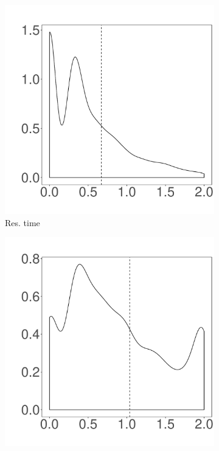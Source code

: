 \begin{figure}[t]
	\centering
        \begin{subfigure}{0.19\textwidth}
                \includegraphics[width=\linewidth]{Figures/runtime-cassandra-cluster.pdf}
                \caption{Res. time}
        \end{subfigure}%
        \begin{subfigure}{0.19\textwidth}
                \includegraphics[width=\linewidth]{Figures/cpu-cassandra-cluster.pdf}

\end{subfigure}
\end{figure}
